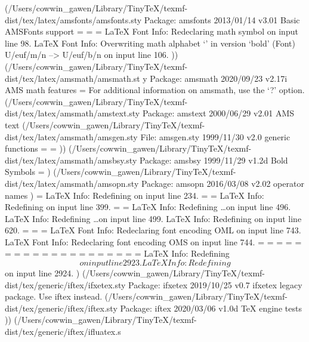 (/Users/cowwin_gawen/Library/TinyTeX/texmf-dist/tex/latex/amsfonts/amsfonts.sty
Package: amsfonts 2013/01/14 v3.01 Basic AMSFonts support
\@emptytoks=
\symAMSa=
\symAMSb=
LaTeX Font Info:    Redeclaring math symbol \hbar on input line 98.
LaTeX Font Info:    Overwriting math alphabet `\mathfrak' in version `bold'
(Font)                  U/euf/m/n --> U/euf/b/n on input line 106.
)) (/Users/cowwin_gawen/Library/TinyTeX/texmf-dist/tex/latex/amsmath/amsmath.st
y
Package: amsmath 2020/09/23 v2.17i AMS math features
\@mathmargin=
For additional information on amsmath, use the `?' option.
(/Users/cowwin_gawen/Library/TinyTeX/texmf-dist/tex/latex/amsmath/amstext.sty
Package: amstext 2000/06/29 v2.01 AMS text
(/Users/cowwin_gawen/Library/TinyTeX/texmf-dist/tex/latex/amsmath/amsgen.sty
File: amsgen.sty 1999/11/30 v2.0 generic functions
\@emptytoks=
\ex@=
)) (/Users/cowwin_gawen/Library/TinyTeX/texmf-dist/tex/latex/amsmath/amsbsy.sty
Package: amsbsy 1999/11/29 v1.2d Bold Symbols
\pmbraise@=
) (/Users/cowwin_gawen/Library/TinyTeX/texmf-dist/tex/latex/amsmath/amsopn.sty
Package: amsopn 2016/03/08 v2.02 operator names
)
\inf@bad=
LaTeX Info: Redefining \frac on input line 234.
\uproot@=
\leftroot@=
LaTeX Info: Redefining \overline on input line 399.
\classnum@=
\DOTSCASE@=
LaTeX Info: Redefining \ldots on input line 496.
LaTeX Info: Redefining \dots on input line 499.
LaTeX Info: Redefining \cdots on input line 620.
\Mathstrutbox@=
\strutbox@=
\big@size=
LaTeX Font Info:    Redeclaring font encoding OML on input line 743.
LaTeX Font Info:    Redeclaring font encoding OMS on input line 744.
\macc@depth=
\c@MaxMatrixCols=
\dotsspace@=
\c@parentequation=
\dspbrk@lvl=
\tag@help=
\row@=
\column@=
\maxfields@=
\andhelp@=
\eqnshift@=
\alignsep@=
\tagshift@=
\tagwidth@=
\totwidth@=
\lineht@=
\@envbody=
\multlinegap=
\multlinetaggap=
\mathdisplay@stack=
LaTeX Info: Redefining \[ on input line 2923.
LaTeX Info: Redefining \] on input line 2924.
) (/Users/cowwin_gawen/Library/TinyTeX/texmf-dist/tex/generic/iftex/ifxetex.sty
Package: ifxetex 2019/10/25 v0.7 ifxetex legacy package. Use iftex instead.
(/Users/cowwin_gawen/Library/TinyTeX/texmf-dist/tex/generic/iftex/iftex.sty
Package: iftex 2020/03/06 v1.0d TeX engine tests
)) (/Users/cowwin_gawen/Library/TinyTeX/texmf-dist/tex/generic/iftex/ifluatex.s
